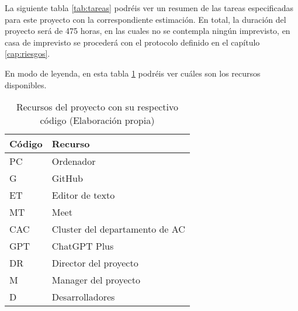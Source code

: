 
La siguiente tabla \ref{tab:tareas} podréis ver un resumen de las tareas especificadas para este proyecto con la correspondiente estimación. En total,
la duración del proyecto será de 475 horas, en las cuales no se contempla ningún imprevisto, en casa de imprevisto se procederá con el protocolo definido
en el capítulo \ref{cap:riesgos}.

En modo de leyenda, en esta tabla \ref{tab:recursos} podréis ver cuáles son los recursos disponibles.

\begin{table}[H]
    \centering
    \begin{tabular}{|l|l|}
    \hline
    \rowcolor[HTML]{8EA9D8} 
    Código & Recurso                        \\ \hline
    PC     & Ordenador                      \\ \hline
    G      & GitHub                         \\ \hline
    ET     & Editor de texto                \\ \hline
    MT     & Meet                           \\ \hline
    CAC    & Cluster del departamento de AC \\ \hline
    GPT    & ChatGPT Plus                   \\ \hline
    DR     & Director del proyecto          \\ \hline
    M      & Manager del proyecto           \\ \hline
    D      & Desarrolladores                \\ \hline
    \end{tabular}
    \caption[Recursos del proyecto con su respectivo código]{Recursos del proyecto con su respectivo código (Elaboración propia)}
    \label{tab:recursos}
\end{table}

